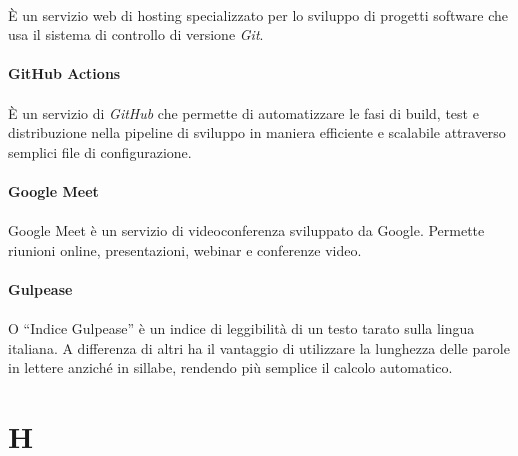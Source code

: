 \documentclass[10pt, a4paper]{article}
\begin{document}
\paragraph{}È un servizio web di hosting specializzato per lo sviluppo di progetti software 
che usa il sistema di controllo di versione \textit{Git\pg}.

\vspace{2em}
\paragraph{GitHub Actions}\noindent\hrulefill
\paragraph{}È un servizio di \textit{GitHub\pg} che permette di automatizzare le fasi di build, test e distribuzione nella pipeline di sviluppo in maniera efficiente e scalabile attraverso semplici file di configurazione.

\vspace{2em}
\paragraph{Google Meet}\noindent\hrulefill
\paragraph{}Google Meet è un servizio di videoconferenza sviluppato da Google. Permette riunioni online, presentazioni, webinar e conferenze video.

\vspace{2em}
\paragraph{Gulpease}\noindent\hrulefill 
\paragraph{}O “Indice Gulpease” è un indice di leggibilità di un testo tarato sulla
lingua italiana. A differenza di altri ha il vantaggio di utilizzare la lunghezza delle
parole in lettere anziché in sillabe, rendendo più semplice il calcolo automatico.

\newpage
\section{H}
\vspace{2em}
\end{document}
